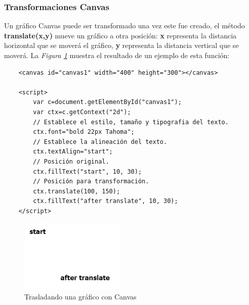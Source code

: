 \subsubsection{Transformaciones Canvas}
\hspace{0.55cm}Un gráfico Canvas puede ser transformado una vez este fue creado, el método \textbf{translate(x,y)} mueve un gráfico a otra posición: \textbf{x} representa la distancia horizontal que se moverá el gráfico, \textbf{y} representa la distancia vertical que se moverá. La \textit{Figura \ref{fig: 28}} muestra el resultado de un ejemplo de esta función:
\begin{lstlisting}
    <canvas id="canvas1" width="400" height="300"></canvas> 
            
    <script>
        var c=document.getElementById("canvas1");
        var ctx=c.getContext("2d");
        // Establece el estilo, tamaño y tipografia del texto.
        ctx.font="bold 22px Tahoma";
        // Establece la alineación del texto.
        ctx.textAlign="start";
        // Posición original.
        ctx.fillText("start", 10, 30);
        // Posición para transformación.
        ctx.translate(100, 150);
        ctx.fillText("after translate", 10, 30);
    </script>
\end{lstlisting}
\begin{figure}[H]
    \centering
    \caption{Trasladando una gráfico con Canvas}
    \label{fig: 28}
    \includegraphics[width=5cm]{ss_html/canvas_translate.png}
\end{figure}

